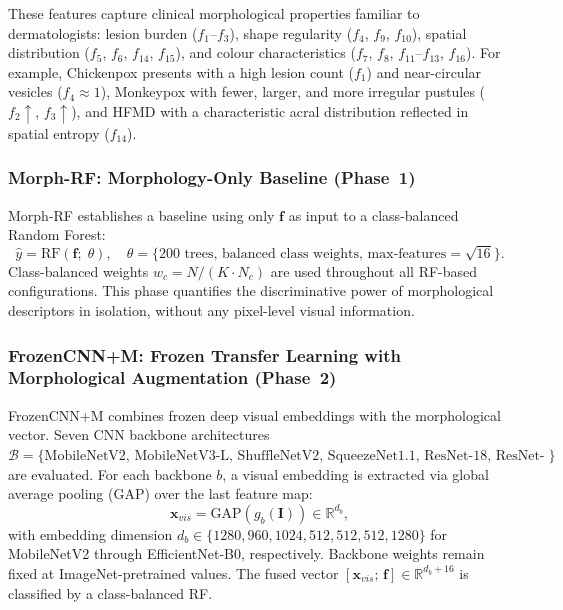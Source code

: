 \documentclass[preprint,12pt]{elsarticle}
\begin{document}
These features capture clinical morphological properties familiar to
dermatologists: lesion burden ($f_1$--$f_3$), shape regularity ($f_4$,
$f_9$, $f_{10}$), spatial distribution ($f_5$, $f_6$, $f_{14}$,
$f_{15}$), and colour characteristics ($f_7$, $f_8$, $f_{11}$--$f_{13}$,
$f_{16}$).  For example, Chickenpox presents with a high lesion count
($f_1$) and near-circular vesicles ($f_4 \approx 1$), Monkeypox with
fewer, larger, and more irregular pustules ($f_2 \uparrow$,
$f_3 \uparrow$), and HFMD with a characteristic acral distribution
reflected in spatial entropy ($f_{14}$).


\subsubsection{Morph-RF: Morphology-Only Baseline (Phase~1)}
\label{sec:phase1}

Morph-RF establishes a baseline using only $\mathbf{f}$ as input to a
class-balanced Random Forest:
\begin{equation}
  \hat{y} = \mathrm{RF}(\mathbf{f};\;\theta),\quad
  \theta = \{\text{200 trees, balanced class weights,
  max-features} = \sqrt{16}\}.
  \label{eq:phase1}
\end{equation}
Class-balanced weights $w_c = N/(K \cdot N_c)$ are used throughout all
RF-based configurations.  This phase quantifies the discriminative power
of morphological descriptors in isolation, without any pixel-level
visual information.


\subsubsection{FrozenCNN+M: Frozen Transfer Learning with
               Morphological Augmentation (Phase~2)}
\label{sec:phase2}

FrozenCNN+M combines frozen deep visual embeddings with the
morphological vector.  Seven CNN backbone architectures
$\mathcal{B} = \{\text{MobileNetV2, MobileNetV3-L, ShuffleNetV2,
SqueezeNet1.1, ResNet-18, ResNet-34, EfficientNet-B0}\}$ are evaluated.
For each backbone $b$, a visual embedding is extracted via global
average pooling (GAP) over the last feature map:
\begin{equation}
  \mathbf{x}_{vis} = \mathrm{GAP}\!\left(g_b(\mathbf{I})\right) \in \mathbb{R}^{d_b},
  \label{eq:phase2_emb}
\end{equation}
with embedding dimension $d_b \in \{1280, 960, 1024, 512, 512, 512, 1280\}$
for MobileNetV2 through EfficientNet-B0, respectively.
Backbone weights remain fixed at ImageNet-pretrained values.
The fused vector $[\mathbf{x}_{vis};\,\mathbf{f}] \in \mathbb{R}^{d_b + 16}$
is classified by a class-balanced RF.
\end{document}
